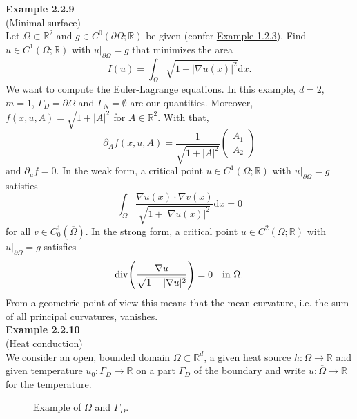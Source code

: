 \textbf{Example 2.2.9}\\
(Minimal surface)\\
Let $\Omega\subset\mathbb{R}^2$ and $g\in C^0(\partial\Omega;\mathbb{R})$ be given (confer \hyperlink{example_1_2_3}{Example 1.2.3}). Find $u\in C^1(\Omega;\mathbb{R})$ with $u|_{\partial\Omega}=g$ that minimizes the area
\[I(u)=\int_\Omega{\sqrt{1+\lvert\nabla u(x)\rvert^2}\mathrm{d}x}.\]
We want to compute the Euler-Lagrange equations. In this example, $d=2$, $m=1$, $\Gamma_D=\partial\Omega$ and $\Gamma_N=\emptyset$ are our quantities. Moreover, $f(x,u,A)=\sqrt{1+\lvert A\rvert^2}$ for $A\in\mathbb{R}^2$. With that,
\[\partial_Af(x,u,A)=\frac{1}{\sqrt{1+\lvert A\rvert^2}}\begin{pmatrix}A_1\\A_2\end{pmatrix}\]
and $\partial_uf=0$. In the weak form, a critical point $u\in C^1(\Omega;\mathbb{R})$ with $u|_{\partial\Omega}=g$ satisfies
\[\int_\Omega{\frac{\nabla u(x)\cdot\nabla v(x)}{\sqrt{1+\lvert\nabla u(x)\rvert^2}}\mathrm{d}x}=0\]
for all $v\in C_0^1(\overline{\Omega})$. In the strong form, a critical point $u\in C^2(\Omega;\mathbb{R})$ with $u|_{\partial\Omega}=g$ satisfies
\[\operatorname{div}\mathopen{}\left(\frac{\nabla u}{\sqrt{1+\lvert\nabla u\rvert^2}}\right)\mathclose{}=0\quad\text{in }\Omega.\]
From a geometric point of view this means that the mean curvature, i.e. the sum of all principal curvatures, vanishes.\\[11pt]

\hypertarget{example_2_2_10}{\textbf{Example 2.2.10}}\\
(Heat conduction)\\
We consider an open, bounded domain $\Omega\subset\mathbb{R}^d$, a given heat source $h:\Omega\longrightarrow\mathbb{R}$ and given temperature $u_0:\Gamma_D\longrightarrow\mathbb{R}$ on a part $\Gamma_D$ of the boundary and write $u:\overline{\Omega}\longrightarrow\mathbb{R}$ for the temperature.

\begin{figure}[ht]
	\centering
	\caption{Example of $\Omega$ and $\Gamma_D$.}
\end{figure}


